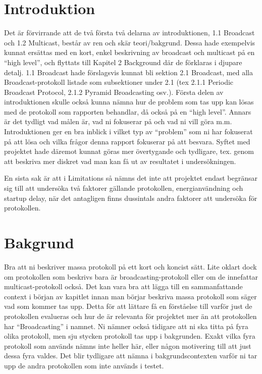 \documentclass{article}
\begin{document}
\section{Introduktion}
Det är förvirrande att de två första två delarna av introduktionen, 1.1 Broadcast och 1.2 Multicast, består av ren och skär teori/bakgrund. Dessa hade exempelvis kunnat ersättas med en kort, enkel beskrivning av broadcast och multicast på en “high level”, och flyttats till Kapitel 2 Background där de förklaras i djupare detalj. 1.1 Broadcast hade förslagsvis kunnat bli sektion 2.1 Broadcast, med alla Broadcast-protokoll listade som subsektioner under 2.1 (tex 2.1.1 Periodic Broadcast Protocol, 2.1.2 Pyramid Broadcasting osv.). Första delen av introduktionen skulle också kunna nämna hur de problem som tas upp kan lösas med de protokoll som rapporten behandlar, då också på en “high level”. Annars är det tydligt vad målen är, vad ni fokuserar på och vad ni vill göra m.m. Introduktionen ger en bra inblick i vilket typ av “problem” som ni har fokuserat på att lösa och vilka frågor denna rapport fokuserar på att besvara. Syftet med projektet hade däremot kunnat göras mer övertygande och tydligare, tex. genom att beskriva mer diskret vad man kan få ut av resultatet i undersökningen. 

En sista sak är att i Limitations så nämns det inte att projektet endast begränsar sig till att undersöka två faktorer gällande protokollen, energianvändning och startup delay, när det antagligen finns dussintals andra faktorer att undersöka för protokollen.


\section{Bakgrund}
Bra att ni beskriver massa protokoll på ett kort och koncist sätt. Lite oklart dock om protokollen som beskrivs bara är broadcasting-protokoll eller om de innefattar multicast-protokoll också. Det kan vara bra att lägga till en sammanfattande context i början av kapitlet innan man börjar beskriva massa protokoll som säger vad som kommer tas upp. Detta för att lättare få en förståelse till varför just de protokollen evalueras och hur de är relevanta för projektet mer än att protokollen har “Broadcasting” i namnet. Ni nämner också tidigare att ni ska titta på fyra olika protokoll, men sju stycken protokoll tas upp i bakgrunden. Exakt vilka fyra protokoll som används nämns inte heller här, eller någon motivering till att just dessa fyra valdes. Det blir tydligare att nämna i bakgrundscontexten varför ni tar upp de andra protokollen som inte används i testet. 
\end{document}
